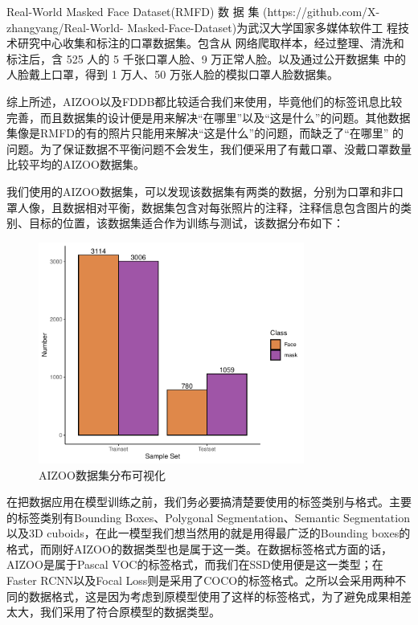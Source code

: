 \documentclass[journal,transmag]{IEEEtran}
\begin{document}
Real-World Masked Face Dataset(RMFD) 数 据 集 (https://github.com/X-zhangyang/Real-World- Masked-Face-Dataset)为武汉大学国家多媒体软件工 程技术研究中心收集和标注的口罩数据集。包含从 网络爬取样本，经过整理、清洗和标注后，含 525 人的 5 千张口罩人脸、9 万正常人脸。以及通过公开数据集 中的人脸戴上口罩，得到 1 万人、50 万张人脸的模拟口罩人脸数据集。

综上所述，AIZOO以及FDDB都比较适合我们来使用，毕竟他们的标签讯息比较完善，而且数据集的设计便是用来解决“在哪里”以及“这是什么”的问题。其他数据集像是RMFD的有的照片只能用来解决“这是什么”的问题，而缺乏了“在哪里” 的问题。为了保证数据不平衡问题不会发生，我们便采用了有戴口罩、没戴口罩数量比较平均的AIZOO数据集。

我们使用的AIZOO数据集，可以发现该数据集有两类的数据，分别为口罩和非口罩人像，且数据相对平衡，数据集包含对每张照片的注释，注释信息包含图片的类别、目标的位置，该数据集适合作为训练与测试，该数据分布如下：
\begin{figure}[h]
\centering
\includegraphics[width=3.44in]{Dataset.pdf}
\caption{AIZOO数据集分布可视化}
\end{figure}

在把数据应用在模型训练之前，我们务必要搞清楚要使用的标签类别与格式。主要的标签类别有Bounding Boxes、Polygonal Segmentation、Semantic Segmentation以及3D cuboids，在此一模型我们想当然用的就是用得最广泛的Bounding boxes的格式，而刚好AIZOO的数据类型也是属于这一类。在数据标签格式方面的话，AIZOO是属于Pascal VOC的标签格式，而我们在SSD使用便是这一类型；在Faster RCNN以及Focal Loss则是采用了COCO的标签格式。之所以会采用两种不同的数据格式，这是因为考虑到原模型使用了这样的标签格式，为了避免成果相差太大，我们采用了符合原模型的数据类型。
\end{document}
